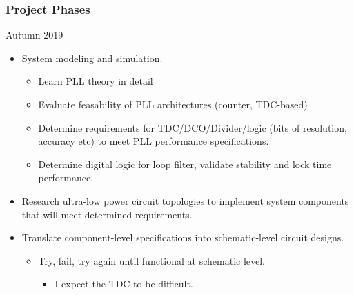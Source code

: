 \documentclass[t, screen, aspectratio=43]{beamer}
\begin{document}
\begin{frame}
	\frametitle{Project Phases}
	\begin{block}{Autumn 2019}
		\footnotesize
		\begin{itemize}
			\item System modeling and simulation.
			\begin{itemize}
				\footnotesize
				\item Learn PLL theory in detail
				\item Evaluate feasability of PLL architectures (counter, TDC-based)
				\item Determine requirements for TDC/DCO/Divider/logic (bits of resolution, accuracy etc) to meet PLL performance specifications.
				\item Determine digital logic for loop filter, validate stability and lock time performance.
			\end{itemize}
			\item Research ultra-low power circuit topologies to implement system components that will meet determined requirements.
			\item Translate component-level specifications into schematic-level circuit designs.
			\begin{itemize}
				\footnotesize
				\item Try, fail, try again until functional at schematic level.
				\begin{itemize}
					\footnotesize
					\item I expect the TDC to be difficult.
				\end{itemize}
			\end{itemize}      
		\end{itemize}
	\end{block}
\end{frame}

\end{document}
